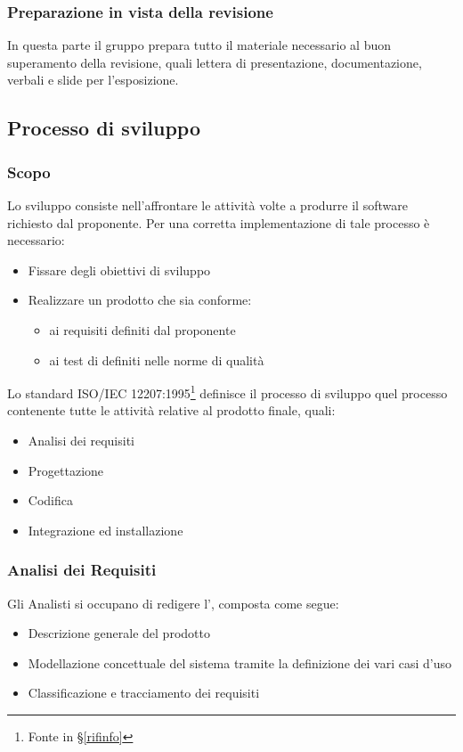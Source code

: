         \subsubsection{Preparazione in vista della revisione}
		In questa parte il gruppo prepara tutto il materiale necessario al buon superamento della revisione, quali lettera di presentazione,
		documentazione, verbali e slide per l'esposizione.


    \subsection{Processo di sviluppo}\label{PP:Sviluppo}

		\subsubsection{Scopo}\label{PP:Sviluppo:Scopo}
		Lo sviluppo consiste nell'affrontare le attività volte a produrre il software richiesto dal proponente. Per una corretta implementazione di tale processo è
		necessario:
		\begin{itemize}
			\item Fissare degli obiettivi di sviluppo
			\item Realizzare un prodotto che sia conforme:
			\begin{itemize}
				\item ai requisiti definiti dal proponente
				\item ai test di definiti nelle norme di qualità
			\end{itemize}
		\end{itemize}
		Lo standard ISO/IEC 12207:1995\footnote{Fonte in \S\ref{rifinfo}} definisce il processo di sviluppo quel processo
		contenente tutte le attività relative al prodotto finale, quali:
		\begin{itemize} %
			\item Analisi dei requisiti
			\item Progettazione
			\item Codifica
			\item Integrazione ed installazione
		\end{itemize}


        \subsubsection{Analisi dei Requisiti}\label{PP:Sviluppo:AdR}
		Gli Analisti si occupano di redigere l'\Doc{\AdRv}, composta come segue:
		\begin{itemize}
			\item Descrizione generale del prodotto
			\item Modellazione concettuale del sistema tramite la definizione dei vari casi d'uso
			\item Classificazione e tracciamento dei requisiti
		\end{itemize}

